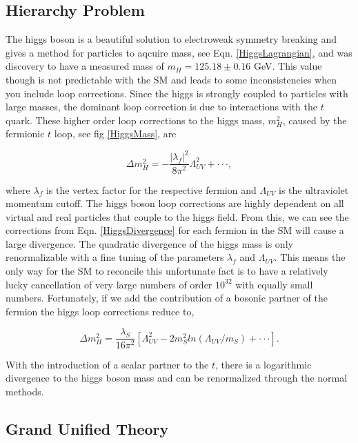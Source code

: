 \subsection{Hierarchy Problem} 
The higgs boson is a beautiful solution to electroweak symmetry breaking and gives a method for particles to aqcuire mass, see Eqn. \ref{HiggsLagrangian},  and was discovery to have a measured mass of $m_{H}=125.18\pm0.16$ GeV. This value though is not predictable with the SM and leads to some inconsistencies when you include loop corrections. Since the higgs is strongly coupled to particles with large masses, the dominant loop correction is due to interactions with the $t$ quark. These higher order loop corrections to the higgs mass, $m_H^2$, caused by the fermionic $t$ loop, see fig \ref{HiggsMass}, are

\begin{equation} \label{HiggsDivergence}
\Delta m_{H}^{2}=-\frac{|\lambda_{f}|^{2}}{8\pi^{2}}\Lambda_{UV}^{2}+\cdot\cdot\cdot,
\end{equation}

where $\lambda_f$ is the vertex factor for the respective fermion and $\Lambda_{UV}$ is the ultraviolet momentum cutoff. The higgs boson loop corrections are highly dependent on all virtual and real particles that couple to the higgs field. From this, we can see the corrections from Eqn. \ref{HiggsDivergence} for each fermion in the SM will cause a large divergence. The quadratic divergence of the higgs mass is only renormalizable with a fine tuning of the parameters $\lambda_f$ and $\Lambda_{UV}$. This means the only way for the SM to reconcile this unfortunate fact is to have a relatively lucky cancellation of very large numbers of order $10^{32}$ with equally small numbers. Fortunately, if we add the contribution of a bosonic partner of the fermion the higgs loop corrections reduce to,

\begin{equation}
\Delta m_{H}^{2}=\frac{\lambda_{S}}{16\pi^{2}}[\Lambda_{UV}^{2} - 2m_{S}^{2}ln(\Lambda_{UV}/m_{S})+\cdot\cdot\cdot].
\label{HiggsRenormalization}
\end{equation}

With the introduction of a scalar partner to the $t$, there is a logarithmic divergence to the higgs boson mass and can be renormalized through the normal methods.

\subsection{Grand Unified Theory}

